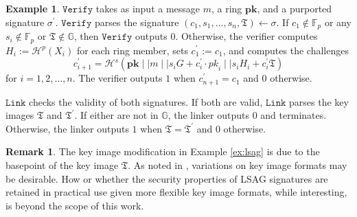 \documentclass{mrl}
\theoremstyle{plain}
\theoremstyle{definition}
\newtheorem{remark}{Remark}[section]
\newtheorem{example}{Example}[section]
\begin{document}
\begin{example}
$\texttt{Verify}$ takes as input a message $m$, a ring $\textbf{pk}$, and a purported signature $\sigma^\prime$. $\texttt{Verify}$ parses the signature $(c_1, s_1, \ldots, s_n, \mathfrak{T}) \leftarrow \sigma$. If $c_1 \notin \mathbb{F}_p$ or any $s_i \notin \mathbb{F}_p$ or $\mathfrak{T} \notin \mathbb{G}$, then $\texttt{Verify}$ outputs $0$. Otherwise, the verifier computes $H_i := \mathcal{H}^p(X_i)$ for each ring member, sets $c_1^\prime := c_1$, and computes the challenges $$c_{i+1}^\prime = \mathcal{H}^s(\textbf{pk} \mid \mid m \mid \mid s_i G + c_i^\prime \cdot \textit{pk}_i \mid \mid s_i H_i + c_i^\prime \mathfrak{T})$$ for $i=1, 2, \ldots, n$. The verifier outputs $1$ when $c_{n+1}^\prime = c_1$ and $0$ otherwise. 

$\texttt{Link}$ checks the validity of both signatures. If both are valid, $\texttt{Link}$ parses the key images $\mathfrak{T}$ and $\mathfrak{T}^\prime$. If either are not in $\mathbb{G}$, the linker outputs $0$ and terminates. Otherwise, the linker outputs $1$ when $\mathfrak{T} = \mathfrak{T}^\prime$ and $0$ otherwise.
\end{example}

\begin{remark}
The key image modification in Example \ref{ex:lsag} is due to the basepoint of the key image $\mathfrak{T}$. As noted in \cite{liu}, variations on key image formats may be desirable. How or whether the security properties of LSAG signatures are retained in practical use given more flexible key image formats, while interesting, is beyond the scope of this work.
\end{remark}
\end{document}
